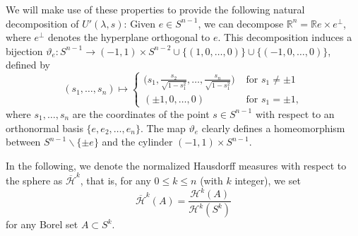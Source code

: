 \documentclass[11pt, a4paper]{amsart}
\newcommand{\sn}{{S^{n-1}}}
\newcommand{\pole}{e}
\newcommand{\rn}{\mathbb R^n}
\begin{document}
We will make use of these properties to provide the following natural decomposition of $U'(\lambda,s)$: Given $\pole\in S^{n-1}$, we can decompose $\rn = \mathbb R \pole \times \pole^\perp $, where $\pole^\perp$ denotes the hyperplane orthogonal to $\pole$. This decomposition induces a bijection $\vartheta_{\pole}\colon  \sn \to  (-1,1)\times S^{n-2} \cup \{(1,0,\ldots,0)\}\cup \{(-1,0,\ldots,0)\}$, defined by 
\begin{equation}\label{e_bijection}
    (s_1, \ldots, s_n) \mapsto
    \begin{cases}
       \Big(s_1,\displaystyle \frac{s_2}{\sqrt{1-s_1^2}},
        \ldots,\frac{s_{n}}{\sqrt{1-s_1^2}} \Big) &\text{ for } s_1\ne \pm1\\
        (\pm 1,0,\ldots,0) &\text{ for } s_1=\pm 1,
    \end{cases}
\end{equation}
where $s_1, \dots, s_{n}$ are the coordinates of the point $s\in\sn$ with respect to an orthonormal basis $\{e,e_2,\ldots,e_n\}$. The map $\vartheta_{\pole}$ clearly defines a homeomorphism between $\sn\backslash\{\pm \pole\}$ and the cylinder $(-1,1) \times \sn$.

In the following, we denote the normalized Hausdorff measures with respect to the sphere as $\overline{\mathcal{H}}^k$, that is, for any $0\leq k\leq n$ (with $k$ integer), we set
\[
    \overline{\mathcal{H}}^{k}(A)=\frac{\mathcal{H}^{k}(A)}{\mathcal{H}^{k}(S^{k})}
\]
for any Borel set $A\subset S^k$.
\end{document}
